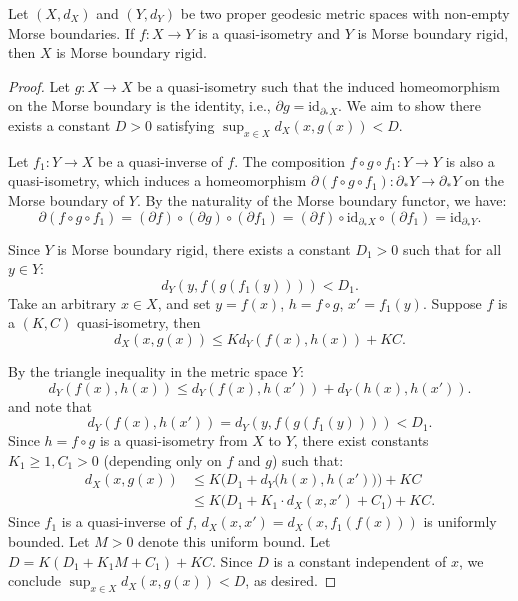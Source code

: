 \documentclass[10pt,a4paper]{amsart}
\begin{document}
\begin{Proposition}
    Let $(X, d_X)$ and $(Y, d_Y)$ be two proper geodesic metric spaces with non-empty Morse boundaries. If $f: X\to Y$ is a quasi-isometry and $Y$ is Morse boundary rigid, then $X$ is Morse boundary rigid.
\end{Proposition}

\begin{proof}

Let \( g: X \to X \) be a quasi-isometry such that the induced homeomorphism on the Morse boundary is the identity, i.e., \( \partial g = \text{id}_{\partial_* X} \). We aim to show there exists a constant \( D > 0 \) satisfying \( \sup_{x \in X} d_X(x, g(x)) < D \).

Let \( f_1: Y \to X \) be a quasi-inverse of \( f \). The composition \( f \circ g \circ f_1: Y \to Y \) is also a quasi-isometry, which induces a homeomorphism \( \partial(f \circ g \circ f_1): \partial_* Y \to \partial_* Y \) on the Morse boundary of \( Y \). By the naturality of the Morse boundary functor, we have:
\[
\partial(f \circ g \circ f_1) = (\partial f) \circ (\partial g) \circ (\partial f_1) = (\partial f) \circ \text{id}_{\partial_* X} \circ (\partial f_1) = \text{id}_{\partial_* Y}.
\]

Since \( Y \) is Morse boundary rigid, there exists a constant \( D_1 > 0 \) such that for all \( y \in Y \):
\[
d_Y\left(y, f\left(g\left(f_1(y)\right)\right)\right) < D_1.
\]
Take an arbitrary \( x \in X \), and set \( y = f(x) \), \( h = f \circ g \), \( x' = f_1(y) \). Suppose \( f \) is a $(K, C)$ quasi-isometry, then
\[
d_X(x, g(x)) \le K d_Y\left(f(x), h(x)\right) + KC.
\]

By the triangle inequality in the metric space \( Y \):
\[
d_Y\left(f(x), h(x)\right) \le d_Y\left(f(x), h(x')\right) + d_Y\left(h(x), h(x')\right).
\]
  and note that
\[
d_Y\left(f(x), h(x')\right) = d_Y\left(y, f\left(g\left(f_1(y)\right)\right)\right) < D_1.
\]
Since \( h = f \circ g \) is a quasi-isometry from \( X \) to \( Y \), there exist constants \( K_1\ge1, C_1 > 0 \) (depending only on \( f \) and \( g \)) such that:
\[
\begin{aligned}
d_X(x, g(x)) 
&\le K \bigl(D_1 + d_Y\bigl(h(x), h(x')\bigr)\bigr) + KC \\
&\le K \bigl(D_1 + K_1 \cdot d_X(x, x') + C_1\bigr) + KC.
\end{aligned}
\]
Since \( f_1 \) is a quasi-inverse of \( f \), \( d_X(x, x') = d_X\left(x, f_1(f(x))\right) \) is uniformly bounded. Let \( M > 0 \) denote this uniform bound.
Let \( D = K \left(D_1 + K_1 M + C_1\right) + KC \). Since \( D \) is a constant independent of \( x \), we conclude \( \sup_{x \in X} d_X(x, g(x)) < D \), as desired.

\end{proof}
\end{document}
